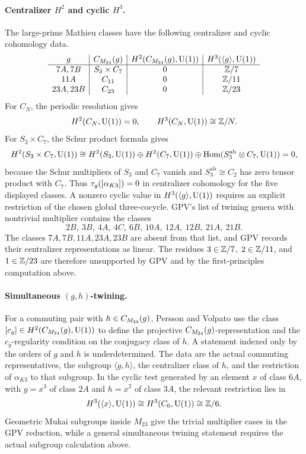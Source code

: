 \paragraph{Centralizer \(H^2\) and cyclic \(H^3\).}
The large-prime Mathieu classes have the following centralizer and
cyclic cohomology data.
\[
\begin{array}{c|c|c|c}
g & C_{M_{24}}(g) & H^2(C_{M_{24}}(g),\mathrm{U}(1)) & H^3(\langle g\rangle,\mathrm{U}(1))\\
\hline
7A,7B & S_3\times C_7 & 0 & \mathbb{Z}/7\\
11A & C_{11} & 0 & \mathbb{Z}/11\\
23A,23B & C_{23} & 0 & \mathbb{Z}/23
\end{array}
\]
For \(C_N\), the periodic resolution gives
\[
  H^2(C_N,\mathrm{U}(1))=0,\qquad H^3(C_N,\mathrm{U}(1))\cong \mathbb{Z}/N.
\]
For \(S_3\times C_7\), the Schur product formula gives
\[
  H^2(S_3\times C_7,\mathrm{U}(1))\cong
  H^2(S_3,\mathrm{U}(1))\oplus H^2(C_7,\mathrm{U}(1))\oplus
  \operatorname{Hom}(S_3^{\mathrm{ab}}\otimes C_7,\mathrm{U}(1))=0,
\]
because the Schur multipliers of \(S_3\) and \(C_7\) vanish and
\(S_3^{\mathrm{ab}}\cong C_2\) has zero tensor product with \(C_7\).
Thus \(\tau_g([\alpha_{K3}])=0\) in centralizer cohomology for the five
displayed classes. A nonzero cyclic value in
\(H^3(\langle g\rangle,\mathrm{U}(1))\) requires an explicit restriction of the
chosen global three-cocycle. GPV's list of twining genera with
nontrivial multiplier contains the classes
\[
  2B,\ 3B,\ 4A,\ 4C,\ 6B,\ 10A,\ 12A,\ 12B,\ 21A,\ 21B.
\]
The classes \(7A,7B,11A,23A,23B\) are absent from that list, and GPV
records their centralizer representations as linear. The residues
\(3\in\mathbb{Z}/7\), \(2\in\mathbb{Z}/11\), and \(1\in\mathbb{Z}/23\) are therefore
unsupported by GPV and by the first-principles computation above.

\paragraph{Simultaneous \((g,h)\)-twining.}
For a commuting pair with \(h\in C_{M_{24}}(g)\), Persson and Volpato use the
class \([c_g]\in H^2(C_{M_{24}}(g),\mathrm{U}(1))\) to define the projective
\(C_{M_{24}}(g)\)-representation and the \(c_g\)-regularity condition on
the conjugacy class of \(h\). A statement indexed only by the orders
of \(g\) and \(h\) is underdetermined. The data are the actual
commuting representatives, the subgroup \(\langle g,h\rangle\), the
centralizer class of \(h\), and the restriction of \(\alpha_{K3}\) to
that subgroup. In the cyclic test generated by an element \(x\) of
class \(6A\), with \(g=x^3\) of class \(2A\) and \(h=x^2\) of class
\(3A\), the relevant restriction lies in
\[
  H^3(\langle x\rangle,\mathrm{U}(1))\cong H^3(C_6,\mathrm{U}(1))\cong \mathbb{Z}/6.
\]
Geometric Mukai subgroups inside \(M_{23}\) give the trivial
multiplier cases in the GPV reduction, while a general simultaneous
twining statement requires the actual subgroup calculation above.

